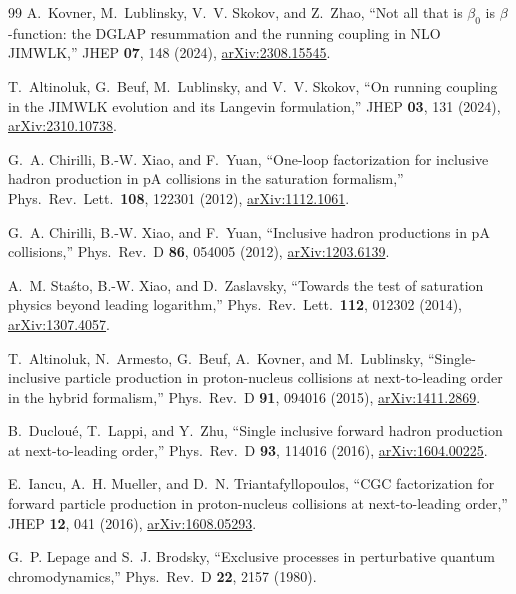 \documentclass[aps,prd,onecolumn,superscriptaddress,nofootinbib,floatfix,longbibliography,11pt]{revtex4-2}
\numberwithin{equation}{section}
\begin{document}
\begin{thebibliography}{99}
A.~Kovner, M.~Lublinsky, V.~V. Skokov, and Z.~Zhao, ``Not all that is $\beta_0$ is $\beta$-function: the DGLAP resummation and the running coupling in NLO JIMWLK,'' JHEP \textbf{07}, 148 (2024), \href{https://arxiv.org/abs/2308.15545}{arXiv:2308.15545}.

T.~Altinoluk, G.~Beuf, M.~Lublinsky, and V.~V. Skokov, ``On running coupling in the JIMWLK evolution and its Langevin formulation,'' JHEP \textbf{03}, 131 (2024), \href{https://arxiv.org/abs/2310.10738}{arXiv:2310.10738}.

G.~A. Chirilli, B.-W. Xiao, and F.~Yuan, ``One-loop factorization for inclusive hadron production in pA collisions in the saturation formalism,'' Phys.\ Rev.\ Lett.\ \textbf{108}, 122301 (2012), \href{https://arxiv.org/abs/1112.1061}{arXiv:1112.1061}.

G.~A. Chirilli, B.-W. Xiao, and F.~Yuan, ``Inclusive hadron productions in pA collisions,'' Phys.\ Rev.\ D \textbf{86}, 054005 (2012), \href{https://arxiv.org/abs/1203.6139}{arXiv:1203.6139}.

A.~M. Sta\'sto, B.-W. Xiao, and D.~Zaslavsky, ``Towards the test of saturation physics beyond leading logarithm,'' Phys.\ Rev.\ Lett.\ \textbf{112}, 012302 (2014), \href{https://arxiv.org/abs/1307.4057}{arXiv:1307.4057}.

T.~Altinoluk, N.~Armesto, G.~Beuf, A.~Kovner, and M.~Lublinsky, ``Single-inclusive particle production in proton-nucleus collisions at next-to-leading order in the hybrid formalism,'' Phys.\ Rev.\ D \textbf{91}, 094016 (2015), \href{https://arxiv.org/abs/1411.2869}{arXiv:1411.2869}.

B.~Duclou\'e, T.~Lappi, and Y.~Zhu, ``Single inclusive forward hadron production at next-to-leading order,'' Phys.\ Rev.\ D \textbf{93}, 114016 (2016), \href{https://arxiv.org/abs/1604.00225}{arXiv:1604.00225}.

E.~Iancu, A.~H. Mueller, and D.~N. Triantafyllopoulos, ``CGC factorization for forward particle production in proton-nucleus collisions at next-to-leading order,'' JHEP \textbf{12}, 041 (2016), \href{https://arxiv.org/abs/1608.05293}{arXiv:1608.05293}.

G.~P. Lepage and S.~J. Brodsky, ``Exclusive processes in perturbative quantum chromodynamics,'' Phys.\ Rev.\ D \textbf{22}, 2157 (1980).


\end{thebibliography}
\end{document}
